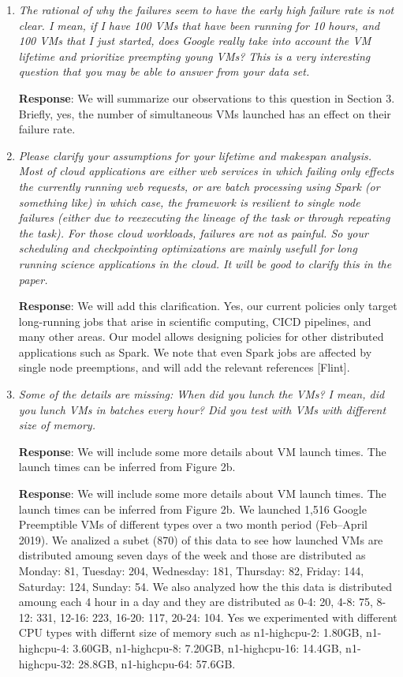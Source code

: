 \documentclass{article}
\newcommand{\resp}[1]{\textbf{Response}: #1}
\newcommand{\revmade}[1]{\textbf{Revision Made}: #1}
\begin{document}
\begin{enumerate}

\item \emph{The rational of why the failures seem to have the early high failure rate is not clear. I mean, if I have 100 VMs that have been running for 10 hours, and 100 VMs that I just started, does Google really take into account the VM lifetime and prioritize preempting young VMs? This is a very interesting question that you may be able to answer from your data set.}

\resp{We will summarize our observations to this question in Section 3. Briefly, yes, the number of simultaneous VMs launched has an effect on their failure rate.}


\item \emph{Please clarify your assumptions for your lifetime and makespan analysis. Most of cloud applications are either web services in which failing only effects the currently running web requests, or are batch processing using Spark (or something like) in which case, the framework is resilient to single node failures (either due to reexecuting the lineage of the task or through repeating the task). For those cloud workloads, failures are not as painful. So your scheduling and checkpointing optimizations are mainly usefull for long running science applications in the cloud. It will be good to clarify this in the paper.}

\resp{We will add this clarification. Yes, our current policies only target long-running jobs that arise in scientific computing, CICD pipelines, and many other areas. Our model allows designing policies for other distributed applications such as Spark. We note that even Spark jobs are affected by single node preemptions, and will add the relevant references [Flint]}.


\item \emph{Some of the details are missing: When did you lunch the VMs? I mean, did you lunch VMs in batches every hour? Did you test with VMs with different size of memory.}

  
\resp{We will include some more details about VM launch times. The launch times can be inferred from Figure 2b.}

\resp{We will include some more details about VM launch times. The launch times can be inferred from Figure 2b.
We launched 1,516 Google Preemptible VMs of different types over a two month period (Feb–April 2019). 
We analized a subet (870) of this data to see how launched VMs are distributed amoung seven days of the week and those are distributed as Monday: 81, Tuesday: 204, Wednesday: 181, Thursday: 82, Friday: 144, Saturday: 124, Sunday: 54.
We also analyzed how the this data is distributed amoung each 4 hour in a day and they are distributed as 0-4: 20, 4-8: 75, 8-12: 331, 12-16: 223, 16-20: 117, 20-24: 104.
Yes we experimented with different CPU types with differnt size of memory such as n1-highcpu-2: 1.80GB, n1-highcpu-4: 3.60GB, n1-highcpu-8: 7.20GB, n1-highcpu-16: 14.4GB, n1-highcpu-32: 28.8GB, n1-highcpu-64: 57.6GB.
}


\end{enumerate}
\end{document}
